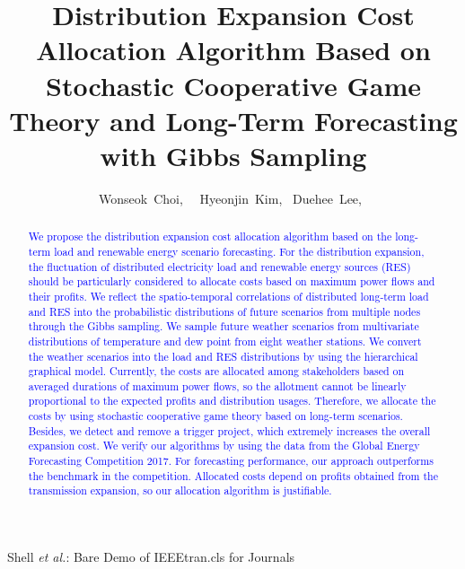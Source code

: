 \documentclass[journal]{IEEEtran} %
\begin{document}
\title{Distribution Expansion Cost Allocation Algorithm Based on Stochastic Cooperative Game Theory and Long-Term Forecasting with Gibbs Sampling}

\author{Wonseok~Choi,~ ~Hyeonjin~Kim,~
	Duehee~Lee,~
	}





{Shell \MakeLowercase{\textit{et al.}}: Bare Demo of IEEEtran.cls for Journals}
\maketitle

\begin{abstract}
\textcolor{blue}{We propose the distribution expansion cost allocation algorithm based on the long-term load and renewable energy scenario forecasting. For the distribution expansion, the fluctuation of distributed electricity load and renewable energy sources (RES) should be particularly considered to allocate costs based on maximum power flows and their profits. We reflect the spatio-temporal correlations of distributed long-term load and RES into the probabilistic distributions of future scenarios from multiple nodes through the Gibbs sampling.
%
We sample future weather scenarios from multivariate distributions of temperature and dew point from eight weather stations. We convert the weather scenarios into the load and RES distributions by using the hierarchical graphical model. 
%
Currently, the costs are allocated among stakeholders based on averaged durations of maximum power flows, so the allotment cannot be linearly proportional to the expected profits and distribution usages. Therefore, we allocate the costs by using stochastic cooperative game theory based on long-term scenarios. Besides, we detect and remove a trigger project, which extremely increases the overall expansion cost.
%
We verify our algorithms by using the data from the Global Energy Forecasting Competition 2017. For forecasting performance, our approach outperforms the benchmark in the competition. Allocated costs depend on profits obtained from the transmission expansion, so our allocation algorithm is justifiable.}
\end{abstract}
\end{document}
